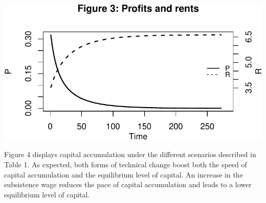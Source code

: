 \documentclass[
  letterpaper,
  DIV=11,
  numbers=noendperiod]{scrreprt}
\begin{document}
\includegraphics{a_ricardian_one_sector_model_files/figure-pdf/ricardo1_2-3.pdf}

Figure 4 displays capital accumulation under the different scenarios
described in Table 1. As expected, both forms of technical change boost
both the speed of capital accumulation and the equilibrium level of
capital. An increase in the subsistence wage reduces the pace of capital
accumulation and leads to a lower equilibrium level of capital.
\end{document}
